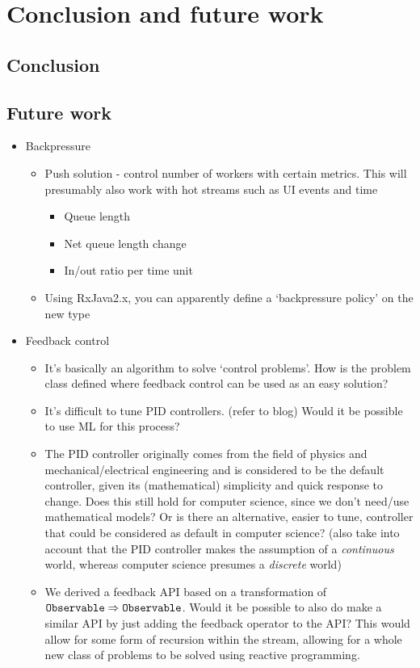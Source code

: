\chapter{Conclusion and future work}

\section{Conclusion}

\section{Future work}
\begin{itemize}
	\item Backpressure
	\begin{itemize}
		\item Push solution - control number of workers with certain metrics. This will presumably also work with hot streams such as UI events and time
		\begin{itemize}
			\item Queue length
			\item Net queue length change
			\item In/out ratio per time unit
		\end{itemize}
		\item Using RxJava2.x, you can apparently define a `backpressure policy' on the new  type
		
	\end{itemize}
	\item Feedback control
	\begin{itemize}
		\item It’s basically an algorithm to solve ‘control problems’. How is the problem class defined where feedback control can be used as an easy solution?
		\item It’s difficult to tune PID controllers. (refer to blog) Would it be possible to use ML for this process?
		\item The PID controller originally comes from the field of physics and mechanical/electrical engineering and is considered to be the default controller, given its (mathematical) simplicity and quick response to change. Does this still hold for computer science, since we don’t need/use mathematical models? Or is there an alternative, easier to tune, controller that could be considered as default in computer science? (also take into account that the PID controller makes the assumption of a \textit{continuous} world, whereas computer science presumes a \textit{discrete} world)
		\item We derived a feedback API based on a transformation of $\texttt{Observable} \Rightarrow \texttt{Observable}$. Would it be possible to also do make a similar API by just adding the feedback operator to the \obs API? This would allow for some form of recursion within the stream, allowing for a whole new class of problems to be solved using reactive programming.
	\end{itemize}
\end{itemize}